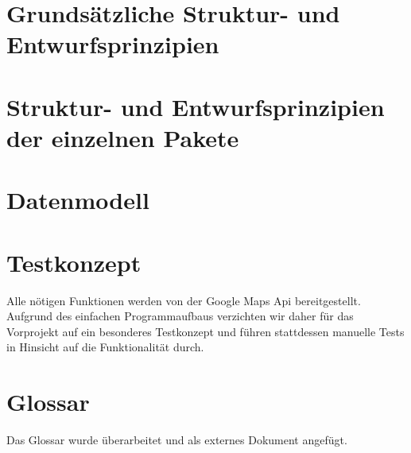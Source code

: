 \documentclass[11pt,a4paper]{article}
\begin{document}
\section{Grundsätzliche Struktur- und Entwurfsprinzipien}
\clearpage
\section{Struktur- und Entwurfsprinzipien der einzelnen Pakete}
\clearpage
\section{Datenmodell}
\clearpage
\section{Testkonzept}
Alle nötigen Funktionen werden von der Google Maps Api bereitgestellt.
Aufgrund des einfachen Programmaufbaus verzichten wir daher für das Vorprojekt auf ein besonderes Testkonzept und führen stattdessen manuelle Tests in Hinsicht auf die Funktionalität durch.
\section{Glossar}
Das Glossar wurde überarbeitet und als externes Dokument angefügt.
\end{document}

